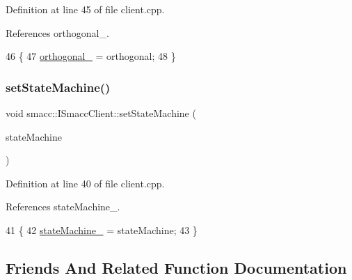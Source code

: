 Definition at line 45 of file client.\+cpp.



References orthogonal\+\_\+.


\begin{DoxyCode}
46 \{
47     \hyperlink{classsmacc_1_1ISmaccClient_a571c7f672d9c90128b5498aefc27c136}{orthogonal\_} = orthogonal;
48 \}
\end{DoxyCode}
\mbox{\label{classsmacc_1_1ISmaccClient_a28fd6ca2bcf9c5e57f3cc16fb0a076d3}} 
\subsubsection{\texorpdfstring{set\+State\+Machine()}{setStateMachine()}}
{\footnotesize\ttfamily void smacc\+::\+I\+Smacc\+Client\+::set\+State\+Machine (\begin{DoxyParamCaption}\item[{\hyperlink{classsmacc_1_1ISmaccStateMachine}{I\+Smacc\+State\+Machine} $\ast$}]{state\+Machine }\end{DoxyParamCaption})\hspace{0.3cm}{\ttfamily [protected]}}



Definition at line 40 of file client.\+cpp.



References state\+Machine\+\_\+.


\begin{DoxyCode}
41 \{
42     \hyperlink{classsmacc_1_1ISmaccClient_a926e4f2ae796def63d48dca389a48c47}{stateMachine\_} = stateMachine;
43 \}
\end{DoxyCode}


\subsection{Friends And Related Function Documentation}
\mbox{\label{classsmacc_1_1ISmaccClient_a6353147888486d8c9d5d1fae476c1efe}} 
